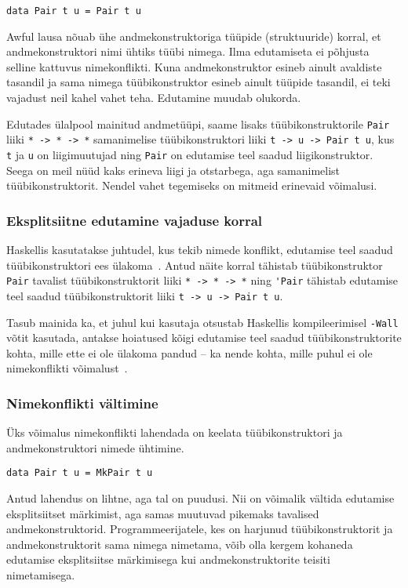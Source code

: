\documentclass[12pt]{article}
\begin{document}
      \begin{verbatim}data Pair t u = Pair t u\end{verbatim}

      Awful lausa nõuab ühe andmekonstruktoriga tüüpide (struktuuride) korral, et andmekonstruktori nimi ühtiks tüübi nimega. Ilma edutamiseta ei põhjusta selline kattuvus nimekonflikti. Kuna andmekonstruktor esineb ainult avaldiste tasandil ja sama nimega tüübikonstruktor esineb ainult tüüpide tasandil, ei teki vajadust neil kahel vahet teha. Edutamine muudab olukorda.

      Edutades ülalpool mainitud andmetüüpi, saame lisaks tüübikonstruktorile \verb!Pair! liiki \verb!* -> * -> *! samanimelise tüübikonstruktori liiki \verb!t -> u -> Pair t u!, kus \verb!t! ja \verb!u! on liigimuutujad ning \verb!Pair! on edutamise teel saadud liigikonstruktor. Seega on meil nüüd kaks erineva liigi ja otstarbega, aga samanimelist tüübikonstruktorit. Nendel vahet tegemiseks on mitmeid erinevaid võimalusi.
      \subsubsection{Eksplitsiitne edutamine vajaduse korral}
        Haskellis kasutatakse juhtudel, kus tekib nimede konflikt, edutamise teel saadud tüübikonstruktori ees ülakoma~\cite{Giv}. Antud näite korral tähistab tüübikonstruktor \verb!Pair! tavalist tüübikonstruktorit liiki \verb!* -> * -> *! ning \verb!'Pair! tähistab edutamise teel saadud tüübikonstruktorit liiki \verb!t -> u -> Pair t u!.

        Tasub mainida ka, et juhul kui kasutaja otsustab Haskellis kompileerimisel \verb!-Wall! võtit kasutada, antakse hoiatused kõigi edutamise teel saadud tüübikonstruktorite kohta, mille ette ei ole ülakoma pandud -- ka nende kohta, mille puhul ei ole nimekonflikti võimalust~\cite{Gla}.
      \subsubsection{Nimekonflikti vältimine}
        Üks võimalus nimekonflikti lahendada on keelata tüübikonstruktori ja andmekonstruktori nimede ühtimine.

        \begin{verbatim}data Pair t u = MkPair t u\end{verbatim}

        Antud lahendus on lihtne, aga tal on puudusi. Nii on võimalik vältida edutamise eksplitsiitset märkimist, aga samas muutuvad pikemaks tavalised andmekonstruktorid. Programmeerijatele, kes on harjunud tüübikonstruktorit ja andmekonstruktorit sama nimega nimetama, võib olla kergem kohaneda edutamise eksplitsiitse märkimisega kui andmekonstruktorite teisiti nimetamisega.
\end{document}

